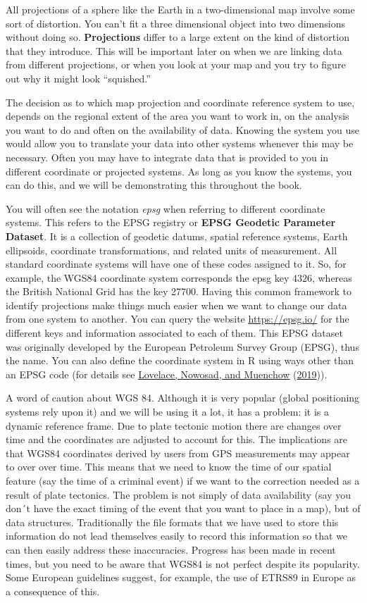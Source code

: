 \documentclass[
  krantz2]{krantz}
\begin{document}
All projections of a sphere like the Earth in a two-dimensional map involve some sort of distortion. You can't fit a three dimensional object into two dimensions without doing so. \textbf{Projections} differ to a large extent on the kind of distortion that they introduce. This will be important later on when we are linking data from different projections, or when you look at your map and you try to figure out why it might look ``squished.''

The decision as to which map projection and coordinate reference system to use, depends on the regional extent of the area you want to work in, on the analysis you want to do and often on the availability of data. Knowing the system you use would allow you to translate your data into other systems whenever this may be necessary. Often you may have to integrate data that is provided to you in different coordinate or projected systems. As long as you know the systems, you can do this, and we will be demonstrating this throughout the book.

You will often see the notation \emph{epsg} when referring to different coordinate systems. This refers to the EPSG registry or \textbf{EPSG Geodetic Parameter Dataset}. It is a collection of geodetic datums, spatial reference systems, Earth ellipsoids, coordinate transformations, and related units of measurement. All standard coordinate systems will have one of these codes assigned to it. So, for example, the WGS84 coordinate system corresponds the epsg key 4326, whereas the British National Grid has the key 27700. Having this common framework to identify projections make things much easier when we want to change our data from one system to another. You can query the website \url{https://epsg.io/} for the different keys and information associated to each of them. This EPSG dataset was originally developed by the European Petroleum Survey Group (EPSG), thus the name. You can also define the coordinate system in R using ways other than an EPSG code (for details see \protect\hyperlink{ref-Lovelace_2019}{Lovelace, Nowosad, and Muenchow} (\protect\hyperlink{ref-Lovelace_2019}{2019})).

A word of caution about WGS 84. Although it is very popular (global positioning systems rely upon it) and we will be using it a lot, it has a problem: it is a dynamic reference frame. Due to plate tectonic motion there are changes over time and the coordinates are adjusted to account for this. The implications are that WGS84 coordinates derived by users from GPS measurements may appear to over over time. This means that we need to know the time of our spatial feature (say the time of a criminal event) if we want to the correction needed as a result of plate tectonics. The problem is not simply of data availability (say you don´t have the exact timing of the event that you want to place in a map), but of data structures. Traditionally the file formats that we have used to store this information do not lead themselves easily to record this information so that we can then easily address these inaccuracies. Progress has been made in recent times, but you need to be aware that WGS84 is not perfect despite its popularity. Some European guidelines suggest, for example, the use of ETRS89 in Europe as a consequence of this.
\end{document}
